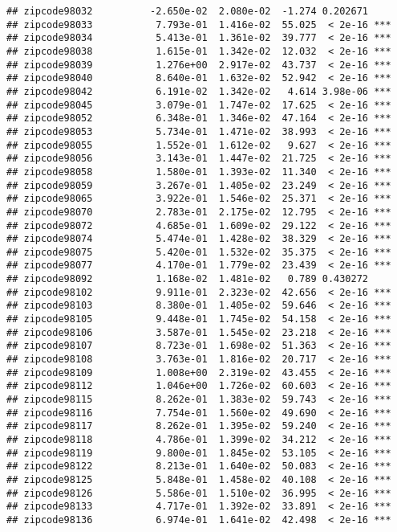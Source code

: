 \documentclass[]{article}
\begin{document}
\begin{verbatim}
## zipcode98032          -2.650e-02  2.080e-02  -1.274 0.202671    
## zipcode98033           7.793e-01  1.416e-02  55.025  < 2e-16 ***
## zipcode98034           5.413e-01  1.361e-02  39.777  < 2e-16 ***
## zipcode98038           1.615e-01  1.342e-02  12.032  < 2e-16 ***
## zipcode98039           1.276e+00  2.917e-02  43.737  < 2e-16 ***
## zipcode98040           8.640e-01  1.632e-02  52.942  < 2e-16 ***
## zipcode98042           6.191e-02  1.342e-02   4.614 3.98e-06 ***
## zipcode98045           3.079e-01  1.747e-02  17.625  < 2e-16 ***
## zipcode98052           6.348e-01  1.346e-02  47.164  < 2e-16 ***
## zipcode98053           5.734e-01  1.471e-02  38.993  < 2e-16 ***
## zipcode98055           1.552e-01  1.612e-02   9.627  < 2e-16 ***
## zipcode98056           3.143e-01  1.447e-02  21.725  < 2e-16 ***
## zipcode98058           1.580e-01  1.393e-02  11.340  < 2e-16 ***
## zipcode98059           3.267e-01  1.405e-02  23.249  < 2e-16 ***
## zipcode98065           3.922e-01  1.546e-02  25.371  < 2e-16 ***
## zipcode98070           2.783e-01  2.175e-02  12.795  < 2e-16 ***
## zipcode98072           4.685e-01  1.609e-02  29.122  < 2e-16 ***
## zipcode98074           5.474e-01  1.428e-02  38.329  < 2e-16 ***
## zipcode98075           5.420e-01  1.532e-02  35.375  < 2e-16 ***
## zipcode98077           4.170e-01  1.779e-02  23.439  < 2e-16 ***
## zipcode98092           1.168e-02  1.481e-02   0.789 0.430272    
## zipcode98102           9.911e-01  2.323e-02  42.656  < 2e-16 ***
## zipcode98103           8.380e-01  1.405e-02  59.646  < 2e-16 ***
## zipcode98105           9.448e-01  1.745e-02  54.158  < 2e-16 ***
## zipcode98106           3.587e-01  1.545e-02  23.218  < 2e-16 ***
## zipcode98107           8.723e-01  1.698e-02  51.363  < 2e-16 ***
## zipcode98108           3.763e-01  1.816e-02  20.717  < 2e-16 ***
## zipcode98109           1.008e+00  2.319e-02  43.455  < 2e-16 ***
## zipcode98112           1.046e+00  1.726e-02  60.603  < 2e-16 ***
## zipcode98115           8.262e-01  1.383e-02  59.743  < 2e-16 ***
## zipcode98116           7.754e-01  1.560e-02  49.690  < 2e-16 ***
## zipcode98117           8.262e-01  1.395e-02  59.240  < 2e-16 ***
## zipcode98118           4.786e-01  1.399e-02  34.212  < 2e-16 ***
## zipcode98119           9.800e-01  1.845e-02  53.105  < 2e-16 ***
## zipcode98122           8.213e-01  1.640e-02  50.083  < 2e-16 ***
## zipcode98125           5.848e-01  1.458e-02  40.108  < 2e-16 ***
## zipcode98126           5.586e-01  1.510e-02  36.995  < 2e-16 ***
## zipcode98133           4.717e-01  1.392e-02  33.891  < 2e-16 ***
## zipcode98136           6.974e-01  1.641e-02  42.498  < 2e-16 ***

\end{verbatim}
\end{document}
